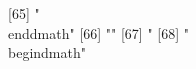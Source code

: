  [65] "\\end{dmath}"                                                                                                                                                                                                                                                                                                                                                                                                                                                                                                                                                                                                                                 
 [66] ""                                                                                                                                                                                                                                                                                                                                                                                                                                                                                                                                                                                                                                             
 [67] "%
 [68] "\\begin{dmath}"                                                                                                                                                                                                                                                                                                                                                                                                                                                                                                                                                                                                                               
